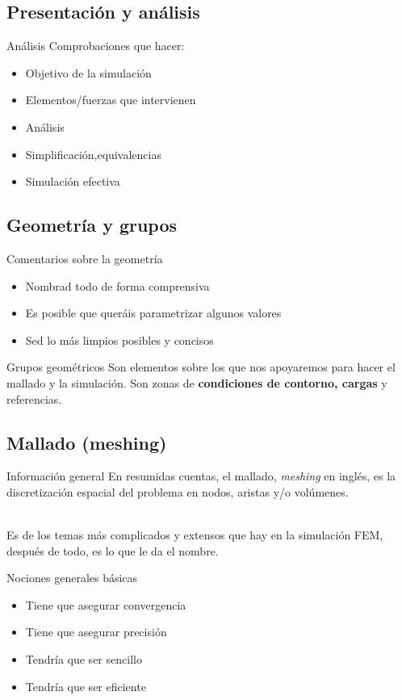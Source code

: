 \documentclass[12pt]{beamer}
\begin{document}
\subsection{Presentación y análisis}

\begin{frame}{Análisis}
	Comprobaciones que hacer:
	\begin{itemize}[label=$\checkmark$]
		\item Objetivo de la simulación
		\item Elementos/fuerzas que intervienen
		\item Análisis
		\item Simplificación,equivalencias
		\item Simulación efectiva
	\end{itemize}
\end{frame}

\subsection{Geometría y grupos}

\begin{frame}{Comentarios sobre la geometría}
	\begin{itemize}
		\item Nombrad todo de forma comprensiva
		\item Es posible que queráis parametrizar algunos valores
		\item Sed lo más limpios posibles y concisos
	\end{itemize}
	\begin{block}{Grupos geométricos}
		Son elementos sobre los que nos apoyaremos para hacer el mallado y la simulación. Son zonas de \textbf{condiciones de contorno, cargas} y referencias.
	\end{block}
\end{frame}

\subsection{Mallado (meshing)}

\begin{frame}{Información general}
	En resumidas cuentas, el mallado, \textit{meshing} en inglés, es la discretización espacial del problema en nodos, aristas y/o volúmenes. \\~
	
	Es de los temas más complicados y extensos que hay en la simulación FEM, después de todo, es lo que le da el nombre.
	
	\begin{block}{Nociones generales básicas}
		\begin{itemize}
			\item Tiene que asegurar convergencia
			\item Tiene que asegurar precisión
			\item Tendría que ser sencillo
			\item Tendría que ser eficiente
		\end{itemize}
	\end{block}
\end{frame}
\end{document}
